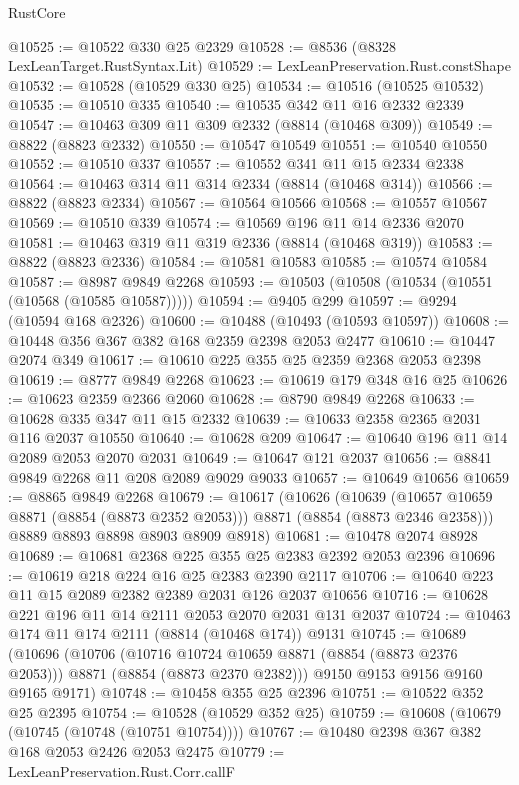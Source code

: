 \begin{lexlean}{RustCore}
\begin{coremodule}
@10525 := @10522 @330 @25 @2329
@10528 := @8536 (@8328 LexLeanTarget.RustSyntax.Lit)
@10529 := LexLeanPreservation.Rust.constShape
@10532 := @10528 (@10529 @330 @25)
@10534 := @10516 (@10525 @10532)
@10535 := @10510 @335
@10540 := @10535 @342 @11 @16 @2332 @2339
@10547 := @10463 @309 @11 @309 @2332 (@8814 (@10468 @309))
@10549 := @8822 (@8823 @2332)
@10550 := @10547 @10549
@10551 := @10540 @10550
@10552 := @10510 @337
@10557 := @10552 @341 @11 @15 @2334 @2338
@10564 := @10463 @314 @11 @314 @2334 (@8814 (@10468 @314))
@10566 := @8822 (@8823 @2334)
@10567 := @10564 @10566
@10568 := @10557 @10567
@10569 := @10510 @339
@10574 := @10569 @196 @11 @14 @2336 @2070
@10581 := @10463 @319 @11 @319 @2336 (@8814 (@10468 @319))
@10583 := @8822 (@8823 @2336)
@10584 := @10581 @10583
@10585 := @10574 @10584
@10587 := @8987 @9849 @2268
@10593 := @10503 (@10508 (@10534 (@10551 (@10568 (@10585 @10587)))))
@10594 := @9405 @299
@10597 := @9294 (@10594 @168 @2326)
@10600 := @10488 (@10493 (@10593 @10597))
@10608 := @10448 @356 @367 @382 @168 @2359 @2398 @2053 @2477
@10610 := @10447 @2074 @349
@10617 := @10610 @225 @355 @25 @2359 @2368 @2053 @2398
@10619 := @8777 @9849 @2268
@10623 := @10619 @179 @348 @16 @25
@10626 := @10623 @2359 @2366 @2060
@10628 := @8790 @9849 @2268
@10633 := @10628 @335 @347 @11 @15 @2332
@10639 := @10633 @2358 @2365 @2031 @116 @2037 @10550
@10640 := @10628 @209
@10647 := @10640 @196 @11 @14 @2089 @2053 @2070 @2031
@10649 := @10647 @121 @2037
@10656 := @8841 @9849 @2268 @11 @208 @2089 @9029 @9033
@10657 := @10649 @10656
@10659 := @8865 @9849 @2268
@10679 := @10617
    (@10626
      (@10639 (@10657 @10659 @8871 (@8854 (@8873 @2352 @2053))) @8871 (@8854 (@8873 @2346 @2358)))
      @8889
      @8893
      @8898
      @8903
      @8909
      @8918)
@10681 := @10478 @2074 @8928
@10689 := @10681 @2368 @225 @355 @25 @2383 @2392 @2053 @2396
@10696 := @10619 @218 @224 @16 @25 @2383 @2390 @2117
@10706 := @10640 @223 @11 @15 @2089 @2382 @2389 @2031 @126 @2037 @10656
@10716 := @10628 @221 @196 @11 @14 @2111 @2053 @2070 @2031 @131 @2037
@10724 := @10463 @174 @11 @174 @2111 (@8814 (@10468 @174)) @9131
@10745 := @10689
    (@10696
      (@10706
        (@10716 @10724 @10659 @8871 (@8854 (@8873 @2376 @2053)))
        @8871
        (@8854 (@8873 @2370 @2382)))
      @9150
      @9153
      @9156
      @9160
      @9165
      @9171)
@10748 := @10458 @355 @25 @2396
@10751 := @10522 @352 @25 @2395
@10754 := @10528 (@10529 @352 @25)
@10759 := @10608 (@10679 (@10745 (@10748 (@10751 @10754))))
@10767 := @10480 @2398 @367 @382 @168 @2053 @2426 @2053 @2475
@10779 := LexLeanPreservation.Rust.Corr.callF

\end{coremodule}
\end{lexlean}
